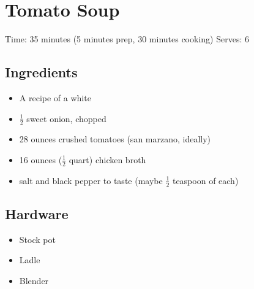\section{Tomato Soup}
\label{tomatoSoup}
\setcounter{secnumdepth}{0}
Time: 35 minutes (5 minutes prep, 30 minutes cooking)
Serves: 6

\begin{multicols}{2}
\subsection*{Ingredients}
\begin{itemize}
    \item A recipe of a white 
    \item \( \frac{1}{2} \) sweet onion, chopped
    \item 28 ounces crushed tomatoes (san marzano, ideally)
    \item 16 ounces (\( \frac{1}{2} \) quart) chicken broth
    \item salt and black pepper to taste (maybe \( \frac{1}{2} \) teaspoon of each)
\end{itemize}

\subsection*{Hardware}
\begin{itemize}
    \item Stock pot
    \item Ladle
    \item Blender
\end{itemize}
\clearpage


\end{multicols}
